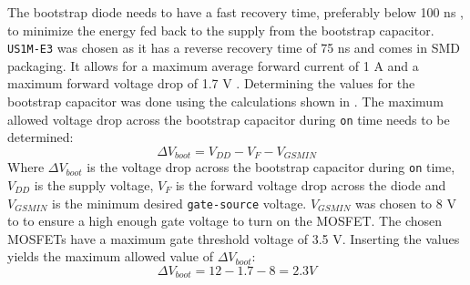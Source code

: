 The bootstrap diode needs to have a fast recovery time, preferably below 100 ns \cite{bootstrap_infineon}, to minimize the energy fed back to the supply from the bootstrap capacitor.
\texttt{US1M-E3} \cite{diode_ds} was chosen as it has a reverse recovery time of 75 ns and comes in SMD packaging. 
It allows for a maximum average forward current of 1 A and a maximum forward voltage drop of 1.7 V \cite{diode_ds}.
Determining the values for the bootstrap capacitor was done using the calculations shown in \cite{bootstrap_ON}.
The maximum allowed voltage drop across the bootstrap capacitor during \texttt{on} time needs to be determined: 
\begin{equation}
\Delta V_{boot} = V_{DD} - V_{F} - V_{GSMIN}
\end{equation}
Where $\Delta V_{boot}$ is the voltage drop across the bootstrap capacitor during \texttt{on} time, $V_{DD}$ is the supply voltage, $V_F$ is the forward voltage drop across the diode and $V_{GSMIN}$ is the minimum desired \texttt{gate-source} voltage.
$V_{GSMIN}$ was chosen to 8 V to to ensure a high enough gate voltage to turn on the MOSFET. 
The chosen MOSFETs have a maximum gate threshold voltage of 3.5 V. 
Inserting the values yields the maximum allowed value of $\Delta V_{boot}$:
\begin{equation}
\Delta V_{boot} = 12 - 1.7 - 8 = 2.3 V	
\end{equation}

